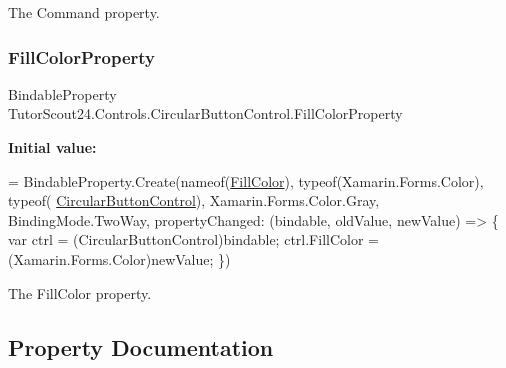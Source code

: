 The Command property. 

\mbox{\label{class_tutor_scout24_1_1_controls_1_1_circular_button_control_a63f2f56f7c88dd4a1f01d5affcbe1b09}} 
\subsubsection{\texorpdfstring{Fill\+Color\+Property}{FillColorProperty}}
{\footnotesize\ttfamily Bindable\+Property Tutor\+Scout24.\+Controls.\+Circular\+Button\+Control.\+Fill\+Color\+Property\hspace{0.3cm}{\ttfamily [static]}}

{\bfseries Initial value\+:}
\begin{DoxyCode}
=
                BindableProperty.Create(nameof(\mbox{\hyperlink{class_tutor_scout24_1_1_controls_1_1_circular_button_control_a0c757d1aaf6e3e6f1fa65a223ea4e7fa}{FillColor}}), typeof(Xamarin.Forms.Color), typeof(
      \mbox{\hyperlink{class_tutor_scout24_1_1_controls_1_1_circular_button_control_a6c8ec4488cf7f6c670146060516a669f}{CircularButtonControl}}),
                    Xamarin.Forms.Color.Gray, BindingMode.TwoWay,
                    propertyChanged: (bindable, oldValue, newValue) =>
                    \{
                        var ctrl = (CircularButtonControl)bindable;
                        ctrl.FillColor = (Xamarin.Forms.Color)newValue;
                    \})
\end{DoxyCode}


The Fill\+Color property. 



\subsection{Property Documentation}
\mbox{\label{class_tutor_scout24_1_1_controls_1_1_circular_button_control_ae661d29f62c71837ed9b347b9f654d55}} 

